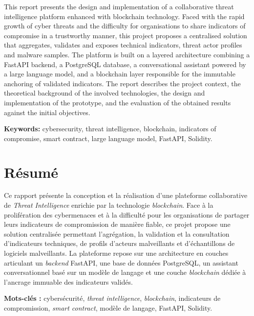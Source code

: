 \documentclass[12pt,a4paper,oneside]{book}
\begin{document}
\normalsize{This report presents the design and implementation of a
collaborative threat intelligence platform enhanced with blockchain
technology. Faced with the rapid growth of cyber threats and the difficulty
for organisations to share indicators of compromise in a trustworthy manner,
this project proposes a centralised solution that aggregates, validates and
exposes technical indicators, threat actor profiles and malware samples. The
platform is built on a layered architecture combining a FastAPI backend, a
PostgreSQL database, a conversational assistant powered by a large language
model, and a blockchain layer responsible for the immutable anchoring of
validated indicators. The report describes the project context, the
theoretical background of the involved technologies, the design and
implementation of the prototype, and the evaluation of the obtained results
against the initial objectives.

\medskip
{\noindent \textbf{Keywords: } cybersecurity, threat intelligence,
blockchain, indicators of compromise, smart contract, large language model,
FastAPI, Solidity. }

\chapter*{Résumé}

\normalsize{Ce rapport présente la conception et la réalisation d'une
plateforme collaborative de \textit{Threat Intelligence} enrichie par la
technologie \textit{blockchain}. Face à la prolifération des cybermenaces et
à la difficulté pour les organisations de partager leurs indicateurs de
compromission de manière fiable, ce projet propose une solution centralisée
permettant l'agrégation, la validation et la consultation d'indicateurs
techniques, de profils d'acteurs malveillants et d'échantillons de logiciels
malveillants. La plateforme repose sur une architecture en couches articulant
un \textit{backend} FastAPI, une base de données PostgreSQL, un assistant
conversationnel basé sur un modèle de langage et une couche
\textit{blockchain} dédiée à l'ancrage immuable des indicateurs validés.

\medskip
{\noindent \textbf{Mots-clés : } cybersécurité, \textit{threat intelligence},
\textit{blockchain}, indicateurs de compromission, \textit{smart contract},
modèle de langage, FastAPI, Solidity. }

}}
\end{document}
